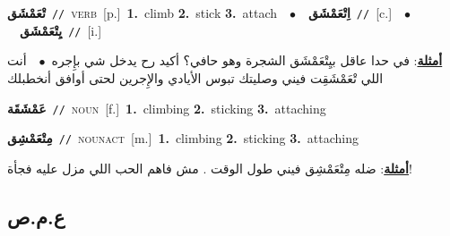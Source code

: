 \documentclass[10pt,a4paper,twoside]{article} %
\begin{document}
\begin{multicols}{2}
{\setlength\topsep{0pt}\textbf{\foreignlanguage{arabic}{تْعَمْشَق}}\ {\color{gray}\texttt{//}\color{black}}\ \textsc{verb}\ [p.]\ \textbf{1.}~climb  \textbf{2.}~stick  \textbf{3.}~attach\ \ $\bullet$\ \ \setlength\topsep{0pt}\textbf{\foreignlanguage{arabic}{اِتْعَمْشَق}}\ {\color{gray}\texttt{//}\color{black}}\ [c.]\ \ $\bullet$\ \ \setlength\topsep{0pt}\textbf{\foreignlanguage{arabic}{يِتْعَمْشَق}}\ {\color{gray}\texttt{//}\color{black}}\ [i.]\  \begin{flushright}\color{gray}\foreignlanguage{arabic}{\textbf{\underline{\foreignlanguage{arabic}{أمثلة}}}: في حدا عاقل بيِتْعَمْشَق الشجرة وهو حافي؟ أكيد رح يدخل شي بإِجره\ $\bullet$\ \  أنت اللي تْعَمْشَقِت فيني وصليتك تبوس الأيادي والإِجرين لحتى أوافق أنخطبلك}\end{flushright}\color{black}} \vspace{2mm}

{\setlength\topsep{0pt}\textbf{\foreignlanguage{arabic}{عَمْشَقَة}}\ {\color{gray}\texttt{//}\color{black}}\ \textsc{noun}\ [f.]\ \textbf{1.}~climbing  \textbf{2.}~sticking  \textbf{3.}~attaching\ } \vspace{2mm}

{\setlength\topsep{0pt}\textbf{\foreignlanguage{arabic}{مِتْعَمْشِق}}\ {\color{gray}\texttt{//}\color{black}}\ \textsc{noun\textunderscore act}\ [m.]\ \textbf{1.}~climbing  \textbf{2.}~sticking  \textbf{3.}~attaching\  \begin{flushright}\color{gray}\foreignlanguage{arabic}{\textbf{\underline{\foreignlanguage{arabic}{أمثلة}}}: ضله مِتْعَمْشِق فيني طول الوقت . مش فاهم الحب اللي مزل عليه فجأة!}\end{flushright}\color{black}} \vspace{2mm}

\vspace{-3mm}
\subsection*{\color{blue}\foreignlanguage{arabic}{ع.م.ص}\color{blue}{}} 


\end{multicols}
\end{document}
